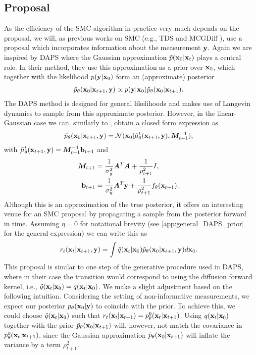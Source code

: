\documentclass{proc}
\begin{document}

\subsection{Proposal}
\label{sec:ddsmc_proposal}
As the efficiency of the SMC algorithm in practice very much depends on the proposal, we will, as previous works on SMC (e.g., TDS \citep{wu_practical_2023} and MCGDiff \citep{cardoso_monte_2023-2}), use a proposal which incorporates information about the measurement $\mathbf{y}$. Again we are inspired by DAPS where the Gaussian approximation $\tilde p(\mathbf{x}_0|\mathbf{x}_{t})$ plays a central role. In their method, they use this approximation as a prior over $\mathbf{x}_0$, which together with the likelihood $p(\mathbf{y}|\mathbf{x}_0)$ form an (approximate) posterior
\begin{align}
    \tilde p_\theta(\mathbf{x}_0|\mathbf{x}_{t+1}, \mathbf{y}) \propto p(\mathbf{y}|\mathbf{x}_0)\tilde p_\theta(\mathbf{x}_0|\mathbf{x}_{t+1}).\label{eq:x0_posterior_general}
\end{align}
The DAPS method is designed for general likelihoods and makes use of Langevin dynamics to sample from this approximate posterior. However, in the linear-Gaussian case we can, similarly to , obtain a closed form expression as
\begin{align}
    \tilde p_\theta(\mathbf{x}_0|\mathbf{x}_{t+1}, \mathbf{y}) = \mathcal{N}(\mathbf{x}_0|\tilde \mu_\theta^t(\mathbf{x}_{t+1}, \mathbf{y}), {\bm{M}}^{-1}_{t+1}), \label{eq:x0_posterior_closed_form}
\end{align}
with $\tilde \mu_\theta^t(\mathbf{x}_{t+1}, \mathbf{y}) = {\bm{M}}^{-1}_{t+1}{\mathbf{b}}_{t+1}$ and
\begin{subequations}
\label{eq:x0_posterior_mean_precisionMat}
\begin{align}
    {\bm{M}}_{t+1} &= \frac{1}{\sigma_y^2}{\bm{A}}^T{\bm{A}} + \frac{1}{\rho_{t+1}^{2}}I, \\ 
    {\mathbf{b}}_{t+1} &= \frac{1}{\sigma_y^2}{\bm{A}}^T\mathbf{y} + \frac{1}{\rho_{t+1}^2}f_\theta(\mathbf{x}_{t+1}).
\end{align}
\end{subequations}
Although this is an approximation of the true posterior, it offers an interesting venue for an SMC proposal by propagating a sample from the posterior forward in time. Assuming $\eta=0$ for notational brevity (see \cref{app:general_DAPS_prior} for the general expression) we can write this as 
\begin{align}
    r_t(\mathbf{x}_{t}|\mathbf{x}_{t+1}, \mathbf{y}) = \int \tilde q(\mathbf{x}_{t}|\mathbf{x}_0)\tilde p_\theta(\mathbf{x}_0|\mathbf{x}_{t+1}, \mathbf{y})d\mathbf{x}_0. \label{eq:ddsmc_proposal_general}
\end{align}
This proposal is similar to one step of the generative procedure used in DAPS, where in their case the transition would correspond to using the diffusion forward kernel, i.e., $\tilde q(\mathbf{x}_{t}|\mathbf{x}_0)=q(\mathbf{x}_{t}|\mathbf{x}_0)$. We make a slight adjustment based on the following intuition. Considering the setting of non-informative measurements, we expect our posterior $p_\theta(\mathbf{x}_0|\mathbf{y})$ to coincide with the prior. To achieve this, we could choose $\tilde q(\mathbf{x}_{t}|\mathbf{x}_0)$ such that $r_t(\mathbf{x}_{t}|\mathbf{x}_{t+1}) = p_\theta^0(\mathbf{x}_{t}|\mathbf{x}_{t+1})$. Using $q(\mathbf{x}_{t}|\mathbf{x}_0)$ together with the prior $\tilde p_\theta(\mathbf{x}_0|\mathbf{x}_{t+1})$ will, however, not match the covariance in $p^0_\theta(\mathbf{x}_{t}|\mathbf{x}_{t+1})$, since the Gaussian approximation $\tilde p_\theta(\mathbf{x}_0|\mathbf{x}_{t+1})$ will inflate the variance by a term $\rho_{t+1}^2$.
\end{document}
